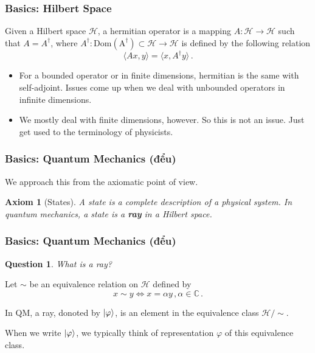 \documentclass[12pt]{beamer}
\newtheorem{axiom}{Axiom}
\newtheorem*{question}{Question}
\begin{document}
\begin{frame}
    \frametitle{ Basics: Hilbert Space}
    \begin{definition}
        Given a Hilbert space $\mathcal{H}$,
        a hermitian operator is a mapping $A:\mathcal{H} \to \mathcal{H}$ such that
        $A = A^\dag$, where $A^\dag: \mathrm{Dom(A^\dag)}\subset \mathcal{H} \to \mathcal{H}$ is defined by the following relation
        \begin{equation*}
            \langle A x , y \rangle = \langle x , A^\dag y \rangle \,.
        \end{equation*}
    \end{definition}
    \begin{itemize}
        \item For a bounded operator or in finite dimensions, hermitian is the same with self-adjoint.
    Issues come up when we deal with unbounded operators in  infinite dimensions.
        \item We mostly deal with finite dimensions, however. So this is not an issue. Just get used
    to the terminology of physicists.
    \end{itemize}

\end{frame}

\begin{frame}
\frametitle{Basics: Quantum Mechanics \pause (đểu)}
We approach this from the axiomatic point of view. 

\begin{axiom}[States]
    A state is a complete description of a physical system. 
    In quantum mechanics, a state is a {\bf ray} in a Hilbert space.
\end{axiom}

    
\end{frame}

\begin{frame}
\frametitle{Basics: Quantum Mechanics (đểu)}
\begin{question}
What is a ray?
\end{question}

Let $\sim$ be an equivalence relation on $\mathcal{H}$ defined by
\begin{equation*}
    x\sim y \iff x = \alpha y\,, \alpha \in \mathbb{C}\,.
\end{equation*}

In QM, a ray, donoted by $\ket{\varphi}$, is an element in the equivalence class $\mathcal{H}/\sim$.

    When we write $\ket{\varphi}$, we typically think of representation $\varphi$ of this equivalence class.
\end{frame}
\end{document}
